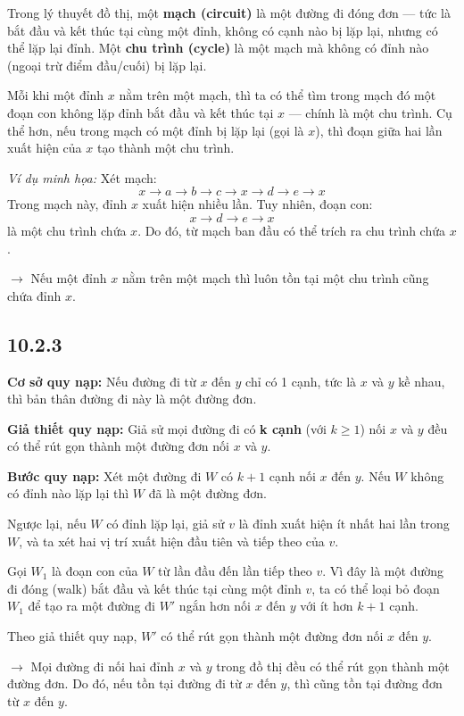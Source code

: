 \documentclass{article}
\begin{document}
	Trong lý thuyết đồ thị, một \textbf{mạch (circuit)} là một đường đi đóng đơn — tức là bắt đầu và kết thúc tại cùng một đỉnh, không có cạnh nào bị lặp lại, nhưng có thể lặp lại đỉnh. Một \textbf{chu trình (cycle)} là một mạch mà không có đỉnh nào (ngoại trừ điểm đầu/cuối) bị lặp lại.
	
	Mỗi khi một đỉnh $x$ nằm trên một mạch, thì ta có thể tìm trong mạch đó một đoạn con không lặp đỉnh bắt đầu và kết thúc tại $x$ — chính là một chu trình. Cụ thể hơn, nếu trong mạch có một đỉnh bị lặp lại (gọi là $x$), thì đoạn giữa hai lần xuất hiện của $x$ tạo thành một chu trình.
	
	\textit{Ví dụ minh họa:} Xét mạch:
	\[
	x \to a \to b \to c \to x \to d \to e \to x
	\]
	Trong mạch này, đỉnh $x$ xuất hiện nhiều lần. Tuy nhiên, đoạn con:
	\[
	x \to d \to e \to x
	\]
	là một chu trình chứa $x$. Do đó, từ mạch ban đầu có thể trích ra chu trình chứa $x$.
	
	\vspace{0.5em}
	$\rightarrow$ Nếu một đỉnh $x$ nằm trên một mạch thì luôn tồn tại một chu trình cũng chứa đỉnh $x$.
	
	\subsection*{10.2.3}
	\textbf{Cơ sở quy nạp:} Nếu đường đi từ $x$ đến $y$ chỉ có 1 cạnh, tức là $x$ và $y$ kề nhau, thì bản thân đường đi này là một đường đơn.
	
	\textbf{Giả thiết quy nạp:} Giả sử mọi đường đi có \textbf{k cạnh} (với $k \geq 1$) nối $x$ và $y$ đều có thể rút gọn thành một đường đơn nối $x$ và $y$.
	
	\textbf{Bước quy nạp:} Xét một đường đi $W$ có $k+1$ cạnh nối $x$ đến $y$. Nếu $W$ không có đỉnh nào lặp lại thì $W$ đã là một đường đơn.
	
	Ngược lại, nếu $W$ có đỉnh lặp lại, giả sử $v$ là đỉnh xuất hiện ít nhất hai lần trong $W$, và ta xét hai vị trí xuất hiện đầu tiên và tiếp theo của $v$.
	
	Gọi $W_1$ là đoạn con của $W$ từ lần đầu đến lần tiếp theo $v$. Vì đây là một đường đi đóng (walk) bắt đầu và kết thúc tại cùng một đỉnh $v$, ta có thể loại bỏ đoạn $W_1$ để tạo ra một đường đi $W'$ ngắn hơn nối $x$ đến $y$ với ít hơn $k+1$ cạnh.
	
	Theo giả thiết quy nạp, $W'$ có thể rút gọn thành một đường đơn nối $x$ đến $y$.
	
	$\rightarrow$ Mọi đường đi nối hai đỉnh $x$ và $y$ trong đồ thị đều có thể rút gọn thành một đường đơn. Do đó, nếu tồn tại đường đi từ $x$ đến $y$, thì cũng tồn tại đường đơn từ $x$ đến $y$.
	
\end{document}
